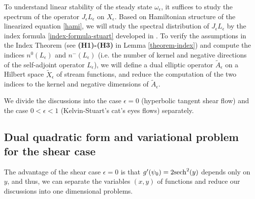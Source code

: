 \documentclass[1 [leqno, 11pt]{amsart}
\numberwithin{equation}{section}
\let\ep=\epsilon
\def\sech{{\rm{sech}}}
\begin{document}
\begin{CJK*}{GBK}{song}
To understand  linear stability of the steady state $\omega_\ep$, it suffices to study the spectrum of the operator $J_\ep L_\ep$ on  $X_\ep$. Based on Hamiltonian structure of the linearized equation \eqref{hami}, we will study the spectral distribution  of $J_\ep L_\ep$  by the index formula \eqref{index-formula-stuart} developed in \cite{lin2022instability}. To verify the assumptions  in the Index Theorem (see {\bf(H1)-(H3)} in Lemma \ref{theorem-index}) and compute the indices  $n^{0}(L_\ep)$ and $n^{-}(L_\ep)$ (i.e. the number of kernel and negative directions of the self-adjoint operator $L_\ep$),   we will define  a dual  elliptic operator $\tilde{A}_\ep$ on a Hilbert space $\tilde{X}_\ep$ of stream functions, and reduce the computation of  the two indices  to the kernel and negative dimensions of $\tilde{A}_\ep$.

We divide the discussions into the  case $\ep = 0$ (hyperbolic tangent shear flow) and the case $0<\ep<1 $ (Kelvin-Stuart's cat's eyes flows) separately.
\subsection{Dual quadratic form and variational problem for the shear case}
The advantage of the shear case $\ep = 0$ is that $g'(\psi_0) = {2}{\sech^2(y)}$ depends only on $y$, and thus, we can separate the variables $(x,y)$ of functions and reduce our discussions into   one dimensional problems.

\end{CJK*}
\end{document}

